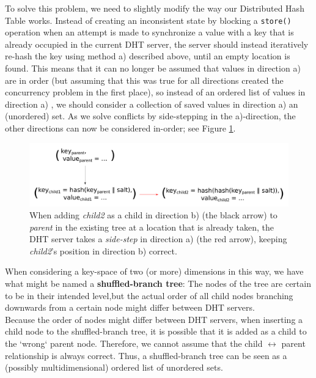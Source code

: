 \documentclass[a4paper]{article}
\begin{document}
To solve this problem, we need to slightly modify the way our Distributed Hash Table works. Instead of creating an inconsistent state by blocking a \texttt{store()} operation when an attempt is made to synchronize a value with a key that is already occupied in the current DHT server, the server should instead iteratively re-hash the key using method \textsf{a)} described above, until an empty location is found. This means that it can no longer be assumed that values in direction \textsf{a)} are in order (but assuming that this was true for all directions created the concurrency problem in the first place), so instead of an ordered list of values in direction \textsf{a)} , we should consider a collection of saved values in direction \textsf{a)} an (unordered) set. As we solve conflicts by side-stepping in the \textsf{a)}-direction, the other directions can now be considered in-order; see Figure \ref{fig:sidestep}. \\


\begin{figure}
	
	\includegraphics[width=\textwidth]{sidestep_explanation.pdf}
	\caption{
	\label{fig:sidestep}	
	When adding \textit{child2} as a child in direction \textsf{b)} (the black arrow) to \textit{parent} in the existing tree at a location that is already taken, the DHT server takes a \textit{side-step} in direction \textsf{a)} (the red arrow), keeping \textit{child2}'s position in direction \textsf{b)} correct. }
\end{figure}

When considering a key-space of two (or more) dimensions in this way, we have what might be named a \textbf{shuffled-branch tree}: The nodes of the tree are certain to be in their intended level,but the actual order of all child nodes branching downwards from a certain node might differ between DHT servers.\\

Because the order of nodes might differ between DHT servers, when inserting a child node to the shuffled-branch tree, it is possible that it is added as a child to the `wrong` parent node. Therefore, we cannot assume that the child $\leftrightarrow$ parent relationship is always correct. Thus, a shuffled-branch tree can be seen as a (possibly multidimensional) ordered list of unordered sets.\\
\end{document}
